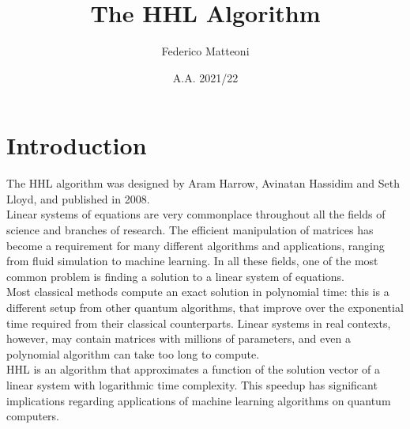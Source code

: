 \documentclass[10pt]{article}
\begin{document}
\title{The HHL Algorithm}
\author{Federico Matteoni}
\date{A.A. 2021/22}
\maketitle
\section{Introduction}
The HHL algorithm was designed by Aram Harrow, Avinatan Hassidim and Seth Lloyd, and published in 2008.\\
Linear systems of equations are very commonplace throughout all the fields of science and branches of research. The efficient manipulation of matrices has become a requirement for many different algorithms and applications, ranging from fluid simulation to machine learning. In all these fields, one of the most common problem is finding a solution to a linear system of equations.\\
Most classical methods compute an exact solution in polynomial time: this is a different setup from other quantum algorithms, that improve over the exponential time required from their classical counterparts. Linear systems in real contexts, however, may contain matrices with millions of parameters, and even a polynomial algorithm can take too long to compute.\\
HHL is an algorithm that approximates a function of the solution vector of a linear system with logarithmic time complexity. This speedup has significant implications regarding applications of machine learning algorithms on quantum computers.
\end{document}
